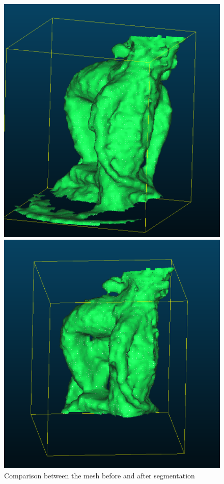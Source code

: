\documentclass[runningheads,a4paper]{llncs}
\begin{document}
\begin{figure}
\begin{minipage}{.5\textwidth}
  \includegraphics[width=0.9\linewidth]{segment-mesh.PNG}
\end{minipage}
\begin{minipage}{.5\textwidth}
  \centering
  \includegraphics[width=0.9\linewidth]{adjusted.PNG}
\end{minipage}
\caption{Comparison between the mesh before and after segmentation}
\label{fig:mesh-segmentation}
\end{figure}
\end{document}
